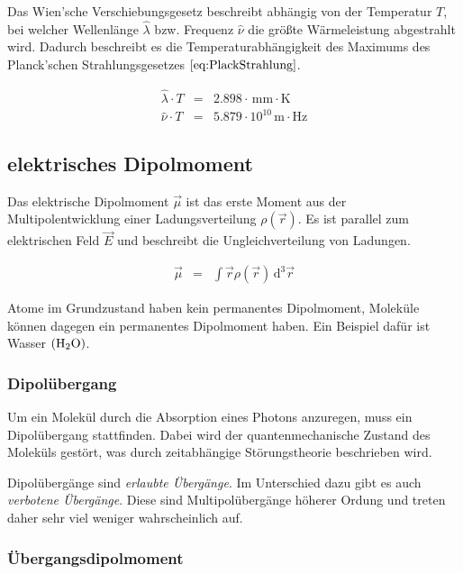 \documentclass[12pt,a4paper]{scrartcl}
\numberwithin{equation}{section} %
\begin{document}
Das Wien'sche Verschiebungsgesetz beschreibt abhängig von der Temperatur $T$, bei welcher Wellenlänge $\hat{\lambda}$ bzw. Frequenz $\hat{\nu}$ die größte Wärmeleistung abgestrahlt wird. Dadurch beschreibt es die Temperaturabhängigkeit des Maximums des Planck'schen Strahlungsgesetzes $\eqref{eq:PlackStrahlung}$.

\begin{eqnarray}
    \hat{\lambda}\cdot T &=& 2.898 \cdot \mathrm{\,mm\cdot K}
        \label{eq:WienLambda}\\
    \hat{\nu}\cdot T &=& 5.879\cdot10^{10} \mathrm{\,m\cdot Hz}
        \label{eq:WienNu}
\end{eqnarray}

\hypertarget{elektrisches-dipolmoment}{%
\subsection{elektrisches Dipolmoment}\label{elektrisches-dipolmoment}}

Das elektrische Dipolmoment $\vec \mu$ ist das erste Moment aus der Multipolentwicklung einer Ladungsverteilung $\rho(\vec r)$. \cite{Dipolmoment} Es ist parallel zum elektrischen Feld $\vec E$ und beschreibt die Ungleichverteilung von Ladungen.

\begin{eqnarray}
    \vec \mu &=& \int \vec r \rho(\vec r) \,\mathrm d^3\vec r
\end{eqnarray}

\noindent
Atome im Grundzustand haben kein permanentes Dipolmoment, Moleküle können dagegen ein permanentes Dipolmoment haben. Ein Beispiel dafür ist Wasser $(\ce{H_2O})$.

\hypertarget{dipoluxfcbergang}{%
\subsubsection{Dipolübergang}\label{dipoluxfcbergang}}

Um ein Molekül durch die Absorption eines Photons anzuregen, muss ein Dipolübergang stattfinden. Dabei wird der quantenmechanische Zustand des Moleküls gestört, was durch zeitabhängige Störungstheorie beschrieben wird. \cite{Hinderer}

Dipolübergänge sind \emph{erlaubte Übergänge}. Im Unterschied dazu gibt es auch \emph{verbotene Übergänge}. Diese sind Multipolübergänge höherer Ordung und treten daher sehr viel weniger wahrscheinlich auf.

\hypertarget{uxfcbergangsdipolmoment}{%
\subsubsection{Übergangsdipolmoment}\label{uxfcbergangsdipolmoment}}
\end{document}
